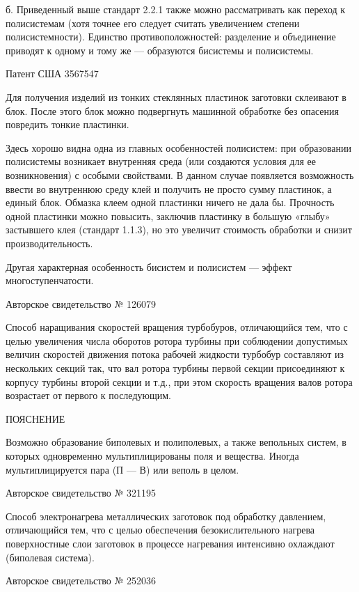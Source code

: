 б.  Приведенный  выше стандарт  2.2.1  также  можно рассматривать  как
переход к  полисистемам (хотя  точнее его следует  считать увеличением
степени  полисистемности). Единство  противоположностей: разделение  и
объединение  приводят к  одному и  тому  же —  образуются бисистемы  и
полисистемы.


Патент США 3567547

Для  получения  изделий  из   тонких  стеклянных  пластинок  заготовки
склеивают  в  блок.  После   этого  блок  можно  подвергнуть  машинной
обработке без опасения повредить тонкие пластинки.

Здесь  хорошо  видна  одна  из главных  особенностей  полисистем:  при
образовании  полисистемы  возникает  внутренняя среда  (или  создаются
условия для  ее возникновения) с  особыми свойствами. В  данном случае
появляется возможность ввести  во внутреннюю среду клей  и получить не
просто сумму пластинок,  а единый блок. Обмазка  клеем одной пластинки
ничего не дала бы. Прочность  одной пластинки можно повысить, заключив
пластинку в большую  «глыбу» застывшего клея (стандарт  1.1.3), но это
увеличит стоимость обработки и снизит производительность.

Другая  характерная   особенность  бисистем  и  полисистем   —  эффект
многоступенчатости.


Авторское свидетельство № 126079

Способ  наращивания скоростей  вращения турбобуров,  отличающийся тем,
что с  целью увеличения числа  оборотов ротора турбины  при соблюдении
допустимых величин скоростей движения потока рабочей жидкости турбобур
составляют из  нескольких секций  так, что  вал ротора  турбины первой
секции присоединяют к  корпусу турбины второй секции и  т.д., при этом
скорость вращения валов ротора возрастает от первого к последующим.

ПОЯСНЕНИЕ

Возможно  образование  биполевых  и  полиполевых,  а  также  вепольных
систем,  в которых  одновременно  мультиплицированы  поля и  вещества.
Иногда мультиплицируется пара (П — В) или веполь в целом.


Авторское свидетельство № 321195

Способ электронагрева металлических заготовок под обработку давлением,
отличающийся тем,  что с  целью обеспечения  безокислительного нагрева
поверхностные   слои  заготовок   в  процессе   нагревания  интенсивно
охлаждают (биполевая система).


Авторское свидетельство № 252036


